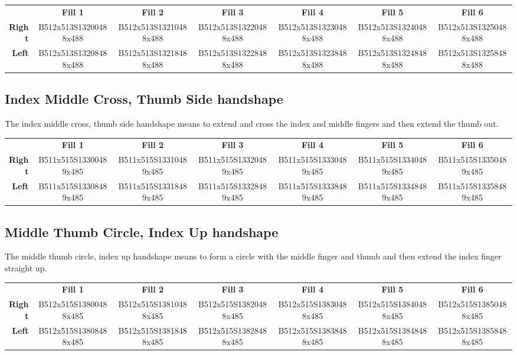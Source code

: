 \documentclass{article}
\begin{document}
\begin{center}
\begin{tabular}{r*{6}{c}}
&\textbf{Fill 1}&\textbf{Fill 2}&\textbf{Fill 3}&\textbf{Fill 4}&\textbf{Fill 5}&\textbf{Fill 6}\\
\textbf{Right}&
B512x513S13200488x488&
B512x513S13210488x488&
B512x513S13220488x488&
B512x513S13230488x488&
B512x513S13240488x488&
B512x513S13250488x488\\
\textbf{Left}&
B512x513S13208488x488&
B512x513S13218488x488&
B512x513S13228488x488&
B512x513S13238488x488&
B512x513S13248488x488&
B512x513S13258488x488\\
\end{tabular}
\end{center}

\subsection{Index Middle Cross, Thumb Side handshape}

The index middle cross, thumb side handshape means to extend and cross the index and middle fingers and then extend the thumb out.

\begin{center}
\begin{tabular}{r*{6}{c}}
&\textbf{Fill 1}&\textbf{Fill 2}&\textbf{Fill 3}&\textbf{Fill 4}&\textbf{Fill 5}&\textbf{Fill 6}\\
\textbf{Right}&
B511x515S13300489x485&
B511x515S13310489x485&
B511x515S13320489x485&
B511x515S13330489x485&
B511x515S13340489x485&
B511x515S13350489x485\\
\textbf{Left}&
B511x515S13308489x485&
B511x515S13318489x485&
B511x515S13328489x485&
B511x515S13338489x485&
B511x515S13348489x485&
B511x515S13358489x485\\
\end{tabular}
\end{center}

\subsection{Middle Thumb Circle, Index Up handshape}

The middle thumb circle, index up handshape means to form a circle with the middle finger and thumb and then extend the index finger straight up.

\begin{center}
\begin{tabular}{r*{6}{c}}
&\textbf{Fill 1}&\textbf{Fill 2}&\textbf{Fill 3}&\textbf{Fill 4}&\textbf{Fill 5}&\textbf{Fill 6}\\
\textbf{Right}&
B512x515S13800488x485&
B512x515S13810488x485&
B512x515S13820488x485&
B512x515S13830488x485&
B512x515S13840488x485&
B512x515S13850488x485\\
\textbf{Left}&
B512x515S13808488x485&
B512x515S13818488x485&
B512x515S13828488x485&
B512x515S13838488x485&
B512x515S13848488x485&
B512x515S13858488x485\\
\end{tabular}
\end{center}
\end{document}
